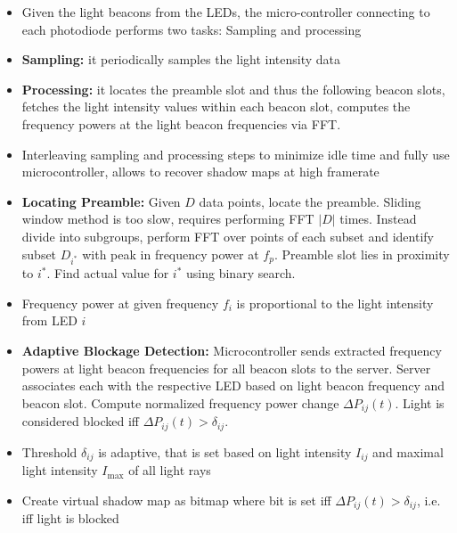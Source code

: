 \documentclass[12pt]{article}
\begin{document}
\begin{itemize}
    \setlength\itemsep{1em}
    \vspace{0.5cm}
    
    \item Given the light beacons from the LEDs, the micro-controller connecting to each photodiode performs two tasks: Sampling and processing
    
    \item \textbf{Sampling:} it periodically samples the light intensity data
    
    \item \textbf{Processing:} it locates the preamble slot and thus the following beacon slots, fetches the light intensity values within each beacon slot, computes the frequency powers at the light beacon frequencies via FFT.
    
    \item Interleaving sampling and processing steps to minimize idle time and fully use microcontroller, allows to recover shadow maps at high framerate
    
    \item \textbf{Locating Preamble:} Given $D$ data points, locate the preamble. Sliding window method is too slow, requires performing FFT $|D|$ times. Instead divide into subgroups, perform FFT over points of each subset and identify subset $D_{i^*}$ with peak in frequency power at $f_p$. Preamble slot lies in proximity to $i^*$. Find actual value for $i^*$ using binary search.
    
    \item Frequency power at given frequency $f_i$ is proportional to the light intensity from LED $i$ 
    
    \item \textbf{Adaptive Blockage Detection:} Microcontroller sends extracted frequency powers at light beacon frequencies for all beacon slots to the server. Server associates each with the respective LED based on light beacon frequency and beacon slot. Compute normalized frequency power change $\Delta P_{ij}(t)$. Light is considered blocked iff $\Delta P_{ij}(t) > \delta_{ij}$.
    
    \item Threshold $\delta_{ij}$ is adaptive, that is set based on light intensity $I_{ij}$ and maximal light intensity $I_\text{max}$ of all light rays
    
    \item Create virtual shadow map as bitmap where bit is set iff $\Delta P_{ij}(t) > \delta_{ij}$, i.e. iff light is blocked
\end{itemize}
\end{document}
